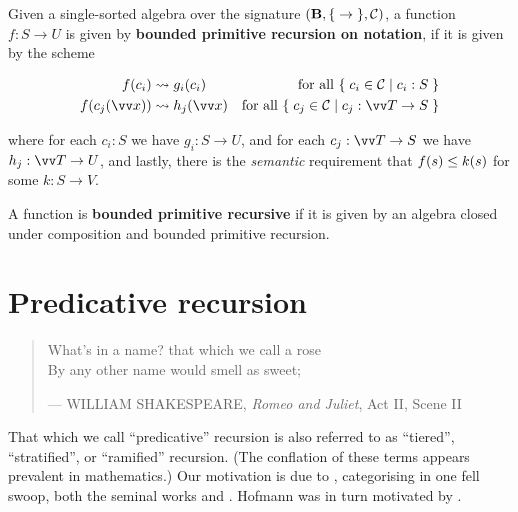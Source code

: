 \begin{specification} Given a single-sorted algebra over the signature
${\mathopen{}\left({\mathbf{B},\mathopen{}\left\{\mathrel{}{\rightarrow}\mathrel{}\right\}\mathclose{},\mathcal{C}}\right)\mathclose{}}$, a function $f : S \rightarrow
U$ is given by \textbf{bounded primitive recursion on notation}, if it is given
by the scheme

\begin{align}
%
f\p{c_i} &\leadsto g_i\p{c_i} & \text{for all $\set{c_i \in \mathcal{C} \st{ c_i :
S}}$} \\
%
f\p{c_j\p{\vect{x}}} &\leadsto h_j\p{\vect{x}} & \text{for all $\set{c_j \in
\mathcal{C} \st{ c_j : \vect{T} \rightarrow S}}$}
%
\end{align}

where for each $c_i : S$ we have $g_i : S \rightarrow U$, and for each $c_j :
\vect{T} \rightarrow S$ we have $h_j : \vect{T} \rightarrow U$, and lastly,
there is the \emph{semantic} requirement that $f{\mathopen{}\left({s}\right)\mathclose{}} \leq k{\mathopen{}\left({s}\right)\mathclose{}}$ for some $k
: S \rightarrow V$.

\end{specification}

\begin{definition} A function is \textbf{bounded primitive recursive} if it is
given by an algebra closed under composition and bounded primitive recursion.
\end{definition}

\section{Predicative recursion}

\begin{quotation}

\footnotesize\sffamily\itshape

\begin{flushright}

What's in a name? that which we call a rose \\
By any other name would smell as sweet;

\smallbreak

\upshape

--- WILLIAM SHAKESPEARE, \emph{Romeo and Juliet}, Act II, Scene II

\end{flushright}

\end{quotation}

That which we call ``predicative'' recursion is also referred to as
``tiered''\cite{leivant-1990}, ``stratified''\cite{leivant-1993}, or
``ramified''\cite{leivant-1995} recursion. (The conflation of these terms
appears prevalent in mathematics.) Our motivation is due to
\cite{hofmann-2000a}, categorising in one fell swoop, both the seminal works
\cite{bellantoni-cook-1992} and \cite{leivant-1995}. Hofmann was in turn
motivated by \cite{bellantoni-phd-1992}.


